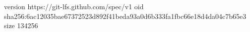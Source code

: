version https://git-lfs.github.com/spec/v1
oid sha256:6ac12035bae67372523d892f41beda93a0d6b333fa1fbc66e18d4da04c7b65e3
size 134256
